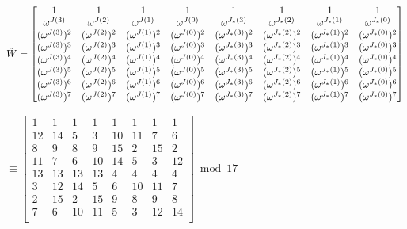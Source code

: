 $\tilde{W} = \begin{bmatrix}
1 & 1 & 1 & 1 & 1 & 1 & 1 & 1\\
\omega^{J(3)} & \omega^{J(2)} & \omega^{J(1)} & \omega^{J(0)} & \omega^{J_*(3)} & \omega^{J_*(2)} & \omega^{J_*(1)} & \omega^{J_*(0)}\\
(\omega^{J(3)})^2 & (\omega^{J(2)})^2 & (\omega^{J(1)})^2 & (\omega^{J(0)})^2 & (\omega^{J_*(3)})^2 & (\omega^{J_*(2)})^2 & (\omega^{J_*(1)})^2 & (\omega^{J_*(0)})^2\\
(\omega^{J(3)})^3 & (\omega^{J(2)})^3 & (\omega^{J(1)})^3 & (\omega^{J(0)})^3 & (\omega^{J_*(3)})^3 & (\omega^{J_*(2)})^3 & (\omega^{J_*(1)})^3 & (\omega^{J_*(0)})^3\\
(\omega^{J(3)})^4 & (\omega^{J(2)})^4 & (\omega^{J(1)})^4 & (\omega^{J(0)})^4 & (\omega^{J_*(3)})^4 & (\omega^{J_*(2)})^4 & (\omega^{J_*(1)})^4 & (\omega^{J_*(0)})^4\\
(\omega^{J(3)})^5 & (\omega^{J(2)})^5 & (\omega^{J(1)})^5 & (\omega^{J(0)})^5 & (\omega^{J_*(3)})^5 & (\omega^{J_*(2)})^5 & (\omega^{J_*(1)})^5 & (\omega^{J_*(0)})^5\\
(\omega^{J(3)})^6 & (\omega^{J(2)})^6 & (\omega^{J(1)})^6 & (\omega^{J(0)})^6 & (\omega^{J_*(3)})^6 & (\omega^{J_*(2)})^6 & (\omega^{J_*(1)})^6 & (\omega^{J_*(0)})^6\\
(\omega^{J(3)})^7 & (\omega^{J(2)})^7 & (\omega^{J(1)})^7 & (\omega^{J(0)})^7 & (\omega^{J_*(3)})^7 & (\omega^{J_*(2)})^7 & (\omega^{J_*(1)})^7 & (\omega^{J_*(0)})^7\\
\end{bmatrix}$ 

$ \equiv \begin{bmatrix}
1 & 1 & 1 & 1 & 1 & 1 & 1 & 1\\
12&14&5&3&10&11&7&6\\
8&9&8&9&15&2&15&2\\
11&7&6&10&14&5&3&12\\
13&13&13&13&4&4&4&4\\
3&12&14&5&6&10&11&7\\
2&15&2&15&9&8&9&8\\
7&6&10&11&5&3&12&14\\
\end{bmatrix} \bmod{17}$ 

$ $ 

